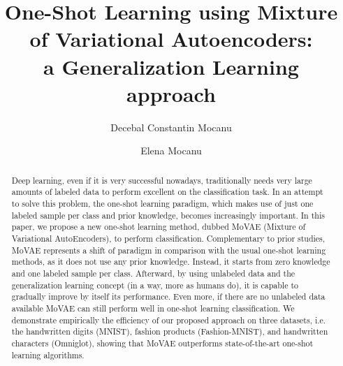 \documentclass[sigconf,authorversion=true]{aamas}  %
\begin{document}
\title{One-Shot Learning using Mixture of Variational Autoencoders:\\a Generalization Learning approach}  %




\author{Decebal Constantin Mocanu}
\author{Elena Mocanu}



\begin{abstract}  %
Deep learning, even if it is very successful nowadays, traditionally needs very large amounts of labeled data to perform excellent on the classification task. In an attempt to solve this problem, the one-shot learning paradigm, which makes use of just one labeled sample per class and prior knowledge, becomes increasingly important. In this paper, we propose a new one-shot learning method, dubbed MoVAE (Mixture of Variational AutoEncoders), to perform classification. Complementary to prior studies, MoVAE represents a shift of paradigm in comparison with the usual one-shot learning methods, as it does not use any prior knowledge. Instead, it starts from zero knowledge and one labeled sample per class. Afterward, by using unlabeled data and the generalization learning concept (in a way, more as humans do), it is capable to gradually improve by itself its performance. Even more, if there are no  unlabeled data available MoVAE can still perform well in one-shot learning classification. We demonstrate empirically the efficiency of our proposed approach on three datasets, i.e. the handwritten digits (MNIST), fashion products (Fashion-MNIST), and handwritten characters (Omniglot), showing that MoVAE outperforms state-of-the-art one-shot learning algorithms.
\end{abstract}





\maketitle
\end{document}
